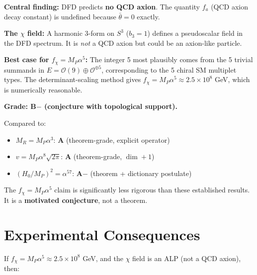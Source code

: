 \documentclass[11pt]{article}
\theoremstyle{definition}
\theoremstyle{remark}
\begin{document}
\begin{tcolorbox}[colback=blue!5!white, colframe=blue!50!black,
  title=Current Status Summary]

\textbf{Central finding:} DFD predicts \textbf{no QCD axion}. The quantity
$f_a$ (QCD axion decay constant) is undefined because $\bar\theta = 0$ exactly.

\textbf{The $\chi$ field:} A harmonic 3-form on $S^3$ ($b_3 = 1$) defines a
pseudoscalar field in the DFD spectrum. It is \textit{not} a QCD axion but
could be an axion-like particle.

\textbf{Best case for $f_\chi = M_P\alpha^5$:} The integer 5 most plausibly
comes from the 5 trivial summands in $E = \mathcal{O}(9) \oplus \mathcal{O}^{\oplus 5}$,
corresponding to the 5 chiral SM multiplet types. The determinant-scaling
method gives $f_\chi = M_P\alpha^5 \approx 2.5 \times 10^8$ GeV, which is
numerically reasonable.

\textbf{Grade: B$-$ (conjecture with topological support).}

Compared to:
\begin{itemize}
\item $M_R = M_P\alpha^3$: \textbf{A} (theorem-grade, explicit operator)
\item $v = M_P\alpha^8\sqrt{2\pi}$: \textbf{A} (theorem-grade, $\dim + 1$)
\item $(H_0/M_P)^2 = \alpha^{57}$: \textbf{A$-$} (theorem + dictionary postulate)
\end{itemize}
The $f_\chi = M_P\alpha^5$ claim is significantly less rigorous than these
established results. It is a \textbf{motivated conjecture}, not a theorem.
\end{tcolorbox}


\section{Experimental Consequences}
\label{sec:experiment}

If $f_\chi = M_P\alpha^5 \approx 2.5 \times 10^8$ GeV, and the $\chi$ field
is an ALP (not a QCD axion), then:
\end{document}
